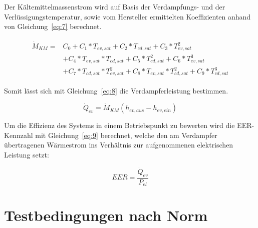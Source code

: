 Der Kältemittelmassenstrom wird auf Basis der Verdampfungs- und der Verlüssigungstemperatur, sowie vom Hersteller ermittelten Koeffizienten anhand von Gleichung~\ref{eq:7} berechnet.

\begin{align}
\label{eq:7}
	\begin{split}
	\dot{M}_{KM} = &C_0 + C_1*T_{ev,sat} + C_2*T_{cd,sat} + C_3*T_{ev,sat}^2 \\
	&+C_4*T_{ev,sat}*T_{cd,sat} + C_5*T_{cd,sat}^2 + C_6*T_{ev,sat}^3 \\
	&+ C_7*T_{cd,sat}*T_{ev,sat}^2 +C_8*T_{ev,sat}*T_{cd,sat}^2 + C_9*T_{cd,sat}^3
	\end{split}
\end{align}

Somit lässt sich mit Gleichung~\ref{eq:8} die Verdampferleistung bestimmen.

\begin{equation}
\label{eq:8}
\dot{Q}_{ev}= \dot{M}_{KM}(h_{ev,aus} - h_{ev,ein})
\end{equation}


Um die Effizienz des Systems in einem Betriebspunkt zu bewerten wird die EER-Kennzahl mit Gleichung~\ref{eq:9} berechnet, welche den am Verdampfer übertragenen Wärmestrom ins Verhältnis zur aufgenommenen elektrischen Leistung setzt\cite{Muller.2016}:

\begin{equation}
\label{eq:9}
EER = \frac{\dot{Q}_{ev}}{P_{el}}
\end{equation}



\section{Testbedingungen nach Norm}
\label{sec:Testbedingungen nach Norm}

